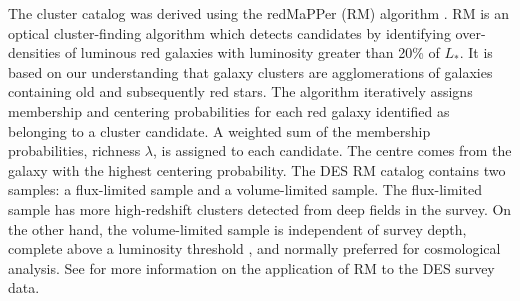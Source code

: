 The cluster catalog was derived using the redMaPPer (RM) algorithm \citep{rykoff14}.
RM is an optical cluster-finding algorithm which detects candidates by identifying over-densities of luminous red galaxies with luminosity greater than 20\% of $L_{*}.$
It is based on our understanding that galaxy clusters are agglomerations of galaxies containing old and subsequently red stars. 
The algorithm iteratively assigns membership and centering probabilities for each red galaxy identified as belonging to a cluster candidate. 
A weighted sum of the membership probabilities, richness $\lambda$, is assigned to each candidate.
The centre comes from the galaxy with the highest centering probability.
The DES RM catalog contains two samples: a flux-limited sample and a volume-limited sample. 
The flux-limited sample has more high-redshift clusters detected from deep fields in the survey. 
On the other hand, the volume-limited sample is independent of survey depth, complete above a luminosity threshold \cite{mcclintock18}, and normally preferred for cosmological analysis.
See \citet{rykoff16} for more information on the application of RM to the DES survey data.

